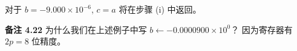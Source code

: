 \documentclass[a4paper]{ctexart}
\begin{document}
{对于 $b = -9.000 \times 10^{-6}$, $c = a$ 将在步骤 (i) 中返回。

\noindent \textbf{备注 4.22 } 
为什么我们在上述例子中写 $b \leftarrow -0.0000900 \times 10^0$？
因为寄存器有 $2p = 8$ 位精度。


  
}
\end{document}
